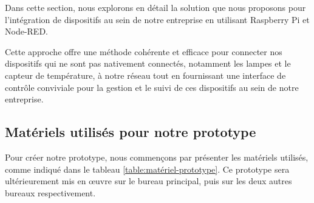 Dans cette section, nous explorons en détail la solution que nous proposons pour l'intégration de dispositifs au sein de notre entreprise en utilisant Raspberry Pi et Node-RED. 

Cette approche offre une méthode cohérente et efficace pour connecter nos dispositifs qui ne sont pas nativement connectés, notamment les lampes et le capteur de température, à notre réseau tout en fournissant une interface de contrôle conviviale pour la gestion et le suivi de ces dispositifs au sein de notre entreprise.



\subsection{Matériels utilisés pour notre prototype}

Pour créer notre prototype, nous commençons par présenter les matériels utilisés, comme indiqué dans le tableau \ref{table:matériel-prototype}. Ce prototype sera ultérieurement mis en œuvre sur le bureau principal, puis sur les deux autres bureaux respectivement.


